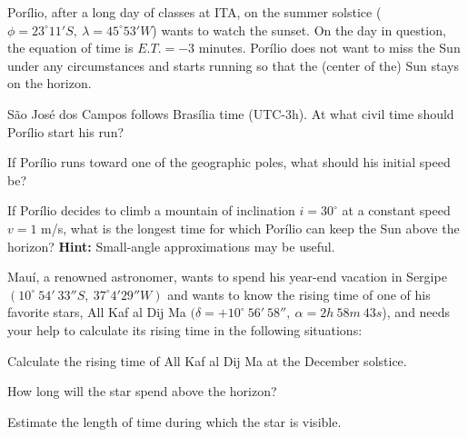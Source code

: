 \documentclass[11pt]{article}
\begin{document}
    
    \begin{pproblem}
        Porílio, after a long day of classes at ITA, on the summer solstice (\(\phi = 23^\circ 11' S, \ \lambda = 45^\circ 53' W\)) wants to watch the sunset. On the day in question, the equation of time is \(E.T. = -3\) minutes. Porílio does not want to miss the Sun under any circumstances and starts running so that the (center of the) Sun stays on the horizon.
    
        \begin{alternativas}
            \item São José dos Campos follows Brasília time (UTC-3h). At what civil time should Porílio start his run?
            \item If Porílio runs toward one of the geographic poles, what should his initial speed be?
            \item If Porílio decides to climb a mountain of inclination \(i = 30^\circ\) at a constant speed \(v = 1\) m/s, what is the longest time for which Porílio can keep the Sun above the horizon?
            \textbf{Hint: } Small-angle approximations may be useful.
        \end{alternativas}
\end{pproblem}

\begin{pproblem}
    Mauí, a renowned astronomer, wants to spend his year-end vacation in Sergipe \((10^\circ \ 54'\ 33'' S, \ 37^\circ 4'29'' W)\) and wants to know the rising time of one of his favorite stars, All Kaf al Dij Ma  \((\delta = +10^\circ \ 56'\ 58'', \ \alpha = 2h \ 58m \ 43s\)), and needs your help to calculate its rising time in the following situations:
    
    \begin{alternativas}
        \item Calculate the rising time of All Kaf al Dij Ma  at the December solstice.
        \item How long will the star spend above the horizon?
        \item Estimate the length of time during which the star is visible.
    \end{alternativas}

    \end{pproblem}
\end{document}
